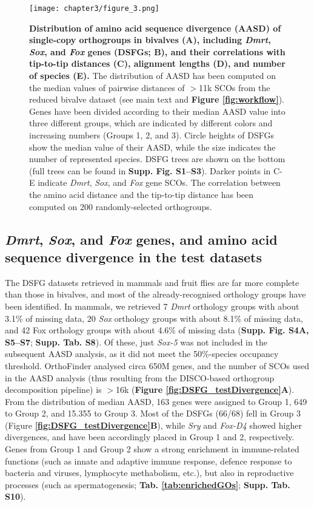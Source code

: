 \documentclass[../main.tex]{subfiles}
\begin{document}
\begin{figure}
    \centering
    \texttt{[image: chapter3/figure\_3.png]}
    \captionsetup{width=\textwidth}
    \caption{
    \textbf{Distribution of amino acid sequence divergence (AASD) of single-copy orthogroups in bivalves (A), including \textit{Dmrt}, \textit{Sox}, and \textit{Fox} genes (DSFGs; B), and their correlations with tip-to-tip distances (C), alignment lengths (D), and number of species (E).} The distribution of AASD has been computed on the median values of pairwise distances of $>$11k SCOs from the reduced bivalve dataset (see main text and \textbf{Figure \ref{fig:workflow}}). Genes have been divided according to their median AASD value into three different groups, which are indicated by different colors and increasing numbers (Groups 1, 2, and 3). Circle heights of DSFGs show the median value of their AASD, while the size indicates the number of represented species. DSFG trees are shown on the bottom (full trees can be found in \textbf{Supp. Fig. S1--S3}). Darker points in C-E indicate \textit{Dmrt}, \textit{Sox}, and \textit{Fox} gene SCOs. The correlation between the amino acid distance and the tip-to-tip distance has been computed on 200 randomly-selected orthogroups.
    }
    \label{fig:DSFG_bivalveDivergence}
\end{figure}

\subsection{\textit{Dmrt}, \textit{Sox}, and \textit{Fox} genes, and amino acid sequence divergence in the test datasets} \label{DSFG_test}
The DSFG datasets retrieved in mammals and fruit flies are far more complete than those in bivalves, and most of the already-recognised orthology groups have been identified.
In mammals, we retrieved 7 \textit{Dmrt} orthology groups with about 3.1\% of missing data, 20 \textit{Sox} orthology groups with about 8.1\% of missing data, and 42 Fox orthology groups with about 4.6\% of missing data (\textbf{Supp. Fig. S4A, S5--S7}; \textbf{Supp. Tab. S8}). Of these, just \textit{Sox-5} was not included in the subsequent AASD analysis, as it did not meet the 50\%-species occupancy threshold. OrthoFinder analysed circa 650M genes, and the number of SCOs used in the AASD analysis (thus resulting from the DISCO-based orthogroup decomposition pipeline) is $>$16k (\textbf{Figure \ref{fig:DSFG_testDivergence}A}). From the distribution of median AASD, 163 genes were assigned to Group 1, 649 to Group 2, and 15.355 to Group 3. Most of the DSFGs (66/68) fell in Group 3 (Figure \textbf{\ref{fig:DSFG_testDivergence}B}), while \textit{Sry} and \textit{Fox-D4} showed higher divergences, and have been accordingly placed in Group 1 and 2, respectively. Genes from Group 1 and Group 2 show a strong enrichment in immune-related functions (such as innate and adaptive immune response, defence response to bacteria and viruses, lymphocyte methabolism, etc.), but also in reproductive processes (such as  spermatogenesis; \textbf{Tab. \ref{tab:enrichedGOs}}; \textbf{Supp. Tab. S10}).
\end{document}
